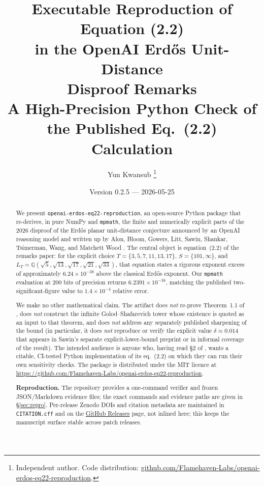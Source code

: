 \documentclass[11pt,a4paper]{article}
\title{%
  Executable Reproduction of Equation (2.2)\\
  in the OpenAI Erd\H{o}s Unit-Distance\\
  Disproof Remarks\\[0.5em]
  \large A High-Precision Python Check of the Published Eq.~(2.2) Calculation}
\author{%
  Yun Kwansub%
  \thanks{Independent author. Code distribution:
    \href{https://github.com/Flamehaven-Labs/openai-erdos-eq22-reproduction}{github.com/Flamehaven-Labs/openai-erdos-eq22-reproduction}.}%
}
\date{Version 0.2.5 --- 2026-05-25}
\theoremstyle{reproduction}
\newcommand{\Q}{\mathbb{Q}}
\begin{document}
\maketitle

\begin{abstract}
We present \texttt{openai-erdos-eq22-reproduction}, an open-source Python package
that re-derives, in pure NumPy and \texttt{mpmath}, the finite and
numerically explicit parts of the 2026 disproof of the Erd\H{o}s planar
unit-distance conjecture announced by an OpenAI reasoning model
\cite{OpenAI2026Proof} and written up by Alon, Bloom, Gowers, Litt,
Sawin, Shankar, Tsimerman, Wang, and Matchett Wood
\cite{Sawin2026Remarks}. The central object is equation~(2.2) of the
remarks paper: for the explicit choice
$T = \{3, 5, 7, 11, 13, 17\}$, $S = \{101, \infty\}$, and
$L_T = \Q(\sqrt{5}, \sqrt{13}, \sqrt{17}, \sqrt{21}, \sqrt{33})$,
that equation states a rigorous exponent excess of approximately
$6.24 \times 10^{-38}$ above the classical Erd\H{o}s exponent. Our
\texttt{mpmath} evaluation
at $200$ bits of precision returns $6.2391 \times 10^{-38}$, matching
the published two-significant-figure value to $1.4 \times 10^{-4}$
relative error.

We make no other mathematical claim. The artifact does \emph{not}
re-prove Theorem~1.1 of \cite{Sawin2026Remarks}, does \emph{not}
construct the infinite Golod--Shafarevich tower whose existence is
quoted as an input to that theorem, and does \emph{not} address any
separately published sharpening of the bound (in particular, it does
\emph{not} reproduce or verify the explicit value
$\delta \approx 0.014$ that appears in Sawin's separate explicit-lower-bound preprint or in informal coverage of the result).
The intended audience is anyone who, having read \S2 of
\cite{Sawin2026Remarks}, wants a citable, CI-tested Python
implementation of its eq.~(2.2) on which they can run their own
sensitivity checks. The package is distributed under the MIT licence
at \url{https://github.com/Flamehaven-Labs/openai-erdos-eq22-reproduction}.

\noindent\textbf{Reproduction.}
The repository provides a one-command verifier and frozen JSON/Markdown
evidence files; the exact commands and evidence paths are given in
\S\ref{sec:repro}. Per-release Zenodo DOIs and citation metadata are
maintained in \texttt{CITATION.cff} and on the
\href{https://github.com/Flamehaven-Labs/openai-erdos-eq22-reproduction/releases}{GitHub
Releases} page, not inlined here; this keeps the manuscript surface
stable across patch releases.
\end{abstract}
\end{document}
